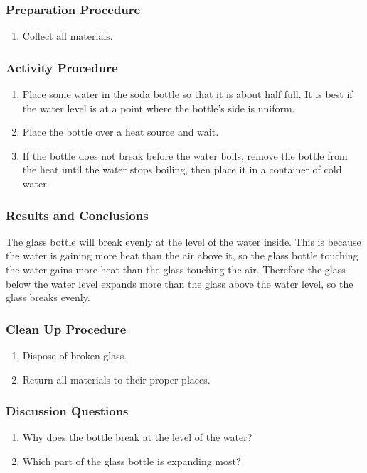 \subsubsection*{Preparation Procedure}
\begin{enumerate}
\item{Collect all materials.}
\end{enumerate}

\subsubsection*{Activity Procedure}
\begin{enumerate}
\item{Place some water in the soda bottle so that it is about half full.  It is best if the water level is at a point where the bottle's side is uniform.}
\item{Place the bottle over a heat source and wait.}
\item{If the bottle does not break before the water boils, remove the bottle from the heat until the water stops boiling, then place it in a container of cold water.}
\end{enumerate}

\subsubsection*{Results and Conclusions}
The glass bottle will break evenly at the level of the water inside.  This is because the water is gaining more heat than the air above it, so the glass bottle touching the water gains more heat than the glass touching the air.  Therefore the glass below the water level expands more than the glass above the water level, so the glass breaks evenly.

\subsubsection*{Clean Up Procedure}
\begin{enumerate}
\item{Dispose of broken glass.}
\item{Return all materials to their proper places.}
\end{enumerate}

\subsubsection*{Discussion Questions}
\begin{enumerate}
\item{Why does the bottle break at the level of the water?}
\item{Which part of the glass bottle is expanding most?}
\end{enumerate}

